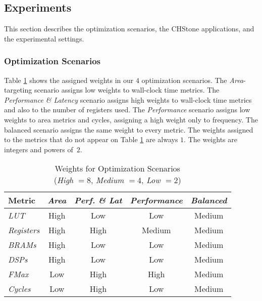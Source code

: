 \subsection{Experiments}
\label{sec:FPGAexp}

This section describes the optimization scenarios, the CHStone applications,
and the experimental settings.

\subsubsection{Optimization Scenarios}

Table \ref{tab:scenarios} shows the assigned weights in our $4$ optimization
scenarios. The \textit{Area}-targeting scenario assigns low weights to
wall-clock time metrics. The \textit{Performance \& Latency} scenario assigns
high weights to wall-clock time metrics and also to the number of registers
used.  The \textit{Performance} scenario assigns low weights to area metrics
and cycles, assigning a high weight only to frequency. The balanced scenario
assigns the same weight to every metric. The weights assigned to the metrics
that do not appear on Table \ref{tab:scenarios} are always $1$. The weights are
integers and powers of~$2$.

\begin{table}[htpb]
    \centering
    \begin{tabular}{@{}lcccc@{}}
        \toprule
        Metric & \textit{Area} & \textit{Perf. \& Lat} & \textit{Performance} & \textit{Balanced} \\ \midrule
        \textit{LUT} & \cellcolor[HTML]{9B94B6} High & \cellcolor[HTML]{DD9583} Low & \cellcolor[HTML]{DD9583} Low & \cellcolor[HTML]{E3DBB3} Medium \\
        \textit{Registers} & \cellcolor[HTML]{9B94B6} High & \cellcolor[HTML]{9B94B6} High & \cellcolor[HTML]{E3DBB3} Medium & \cellcolor[HTML]{E3DBB3} Medium \\
        \textit{BRAMs} & \cellcolor[HTML]{9B94B6} High & \cellcolor[HTML]{DD9583} Low & \cellcolor[HTML]{DD9583} Low & \cellcolor[HTML]{E3DBB3} Medium \\
        \textit{DSPs} & \cellcolor[HTML]{9B94B6} High & \cellcolor[HTML]{DD9583} Low & \cellcolor[HTML]{DD9583} Low & \cellcolor[HTML]{E3DBB3} Medium \\
        \textit{FMax} & \cellcolor[HTML]{DD9583} Low & \cellcolor[HTML]{9B94B6} High & \cellcolor[HTML]{9B94B6} High & \cellcolor[HTML]{E3DBB3} Medium \\
        \textit{Cycles} & \cellcolor[HTML]{DD9583} Low & \cellcolor[HTML]{9B94B6} High & \cellcolor[HTML]{DD9583} Low & \cellcolor[HTML]{E3DBB3} Medium \\ \bottomrule
    \end{tabular}
    \caption{Weights for Optimization Scenarios \\ (\textit{High} $= 8$, \textit{Medium} $= 4$, \textit{Low} $= 2$)}
    \label{tab:scenarios}
\end{table}

